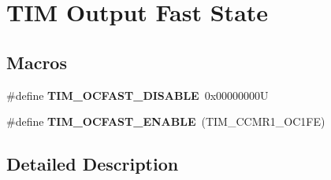 \hypertarget{group___t_i_m___output___fast___state}{}\section{T\+IM Output Fast State}
\label{group___t_i_m___output___fast___state}
\subsection*{Macros}
\begin{DoxyCompactItemize}
\item 
\mbox{\label{group___t_i_m___output___fast___state_ga71429b63f2a6604171ccfd3a91ccf43a}} 
\#define {\bfseries T\+I\+M\+\_\+\+O\+C\+F\+A\+S\+T\+\_\+\+D\+I\+S\+A\+B\+LE}~0x00000000U
\item 
\mbox{\label{group___t_i_m___output___fast___state_ga445a2c0633ac649e816cf7a16b716d61}} 
\#define {\bfseries T\+I\+M\+\_\+\+O\+C\+F\+A\+S\+T\+\_\+\+E\+N\+A\+B\+LE}~(T\+I\+M\+\_\+\+C\+C\+M\+R1\+\_\+\+O\+C1\+FE)
\end{DoxyCompactItemize}


\subsection{Detailed Description}
